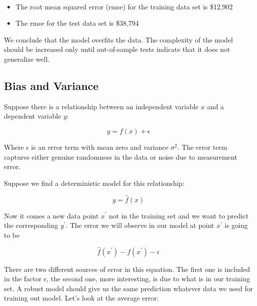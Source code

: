 \documentclass[11pt]{article}
\providecommand{\tightlist}{%
      \setlength{\itemsep}{0pt}\setlength{\parskip}{0pt}}
\begin{document}
    \begin{center}
    \end{center}
    { \hspace*{\fill} \\}
    
    \begin{itemize}
\tightlist
\item
  The root mean squared error (rmse) for the training data set is
  \$12,902
\item
  The rmse for the test data set is \$38,794
\end{itemize}

We conclude that the model overfits the data. The complexity of the
model should be increased only until out-of-sample tests indicate that
it does not generalize well.

    \hypertarget{bias-and-variance}{%
\subsection{Bias and Variance}\label{bias-and-variance}}

Suppose there is a relationship between an independent variable \(x\)
and a dependent variable \(y\):

\begin{equation}
    y=f(x) + \epsilon
\end{equation}

Where \(\epsilon\) is an error term with mean zero and variance
\(\sigma^2\). The error term captures either genuine randomness in the
data or noise due to measurement error.

Suppose we find a deterministic model for this relationship:

\begin{equation}
    y = \hat f(x)
\end{equation}

Now it comes a new data point \(x^\prime\) not in the training set and
we want to predict the corresponding \(y^\prime\). The error we will
observe in our model at point \(x^\prime\) is going to be

\begin{equation}
    \hat f(x^\prime) - f(x^\prime) - \epsilon
\end{equation}

There are two different sources of error in this equation. The first one
is included in the factor \(\epsilon\), the second one, more
interesting, is due to what is in our training set. A robust model
should give us the same prediction whatever data we used for training
out model. Let's look at the average error:
\end{document}
